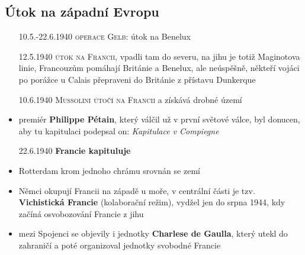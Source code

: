 \documentclass{article}
\begin{document}
\subsection*{Útok na západní Evropu}
\begin{itemize}
    \item[10.5.-22.6.1940] \textsc{operace Gelb}: útok na Benelux
    \item[12.5.1940] \textsc{útok na Francii}, vpadli tam do severu, na jihu je totiž Maginotova linie, Francouzům pomáhají Británie a Benelux, ale neúspěšně, někteří vojáci po porážce u Calais přepraveni do Británie z přístavu Dunkerque
    \item[10.6.1940] \textsc{Mussolini útočí na Francii} a získává drobné území
    \item premiér \textbf{Philippe Pétain}, který válčil už v první světové válce, byl donucen, aby tu kapitulaci podepsal on: \textit{Kapitulace v Compiegne}
    \item[22.6.1940] \textbf{Francie kapituluje}
    \item Rotterdam krom jednoho chrámu srovnán se zemí
    \item Němci okupují Francii na západě u moře, v centrální části je tzv. \textbf{Vichistická Francie} (kolaborační režim), vydžel jen do srpna 1944, kdy začíná osvobozování Francie z jihu
    \item mezi Spojenci se objevily i jednotky \textbf{Charlese de Gaulla}, který utekl do zahraničí a poté organizoval jednotky svobodné Francie
\end{itemize}
\end{document}
